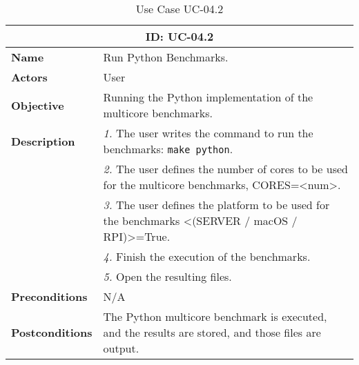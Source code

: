 \begin{table}[H]
    \centering
    \begin{tabular}{l p{10cm}}
        \toprule
        \multicolumn{2}{c}{\textbf{ID: UC-04.2}} \\
        \toprule
        \textbf{Name}                         &  Run Python Benchmarks. \\
        \textbf{Actors}                       &  User \\
        \textbf{Objective}                    &  Running the Python implementation of the multicore benchmarks. \\
        \multirow{1}{*}{\textbf{Description}} & \textsl{1.} The user writes the command to run the benchmarks: \texttt{make python}.\\
                                              & \textsl{2.} The user defines the number of cores to be used for the multicore benchmarks, CORES=<num>.\\
                                              & \textsl{3.} The user defines the platform to be used for the benchmarks <(SERVER / macOS / RPI)>=True.\\
                                              & \textsl{4.} Finish the execution of the benchmarks.\\
                                              & \textsl{5.} Open the resulting files.\\
        \textbf{Preconditions}                &  N/A \\
        \textbf{Postconditions}               &  The Python multicore benchmark is executed, and the results are stored, and those files are output. \\
    \end{tabular}
    \caption{Use Case UC-04.2}
    \label{tab:uc-04.2}
\end{table}


